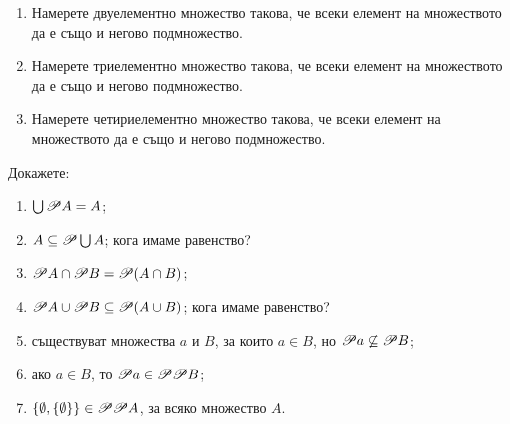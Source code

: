 \begin{problem}
  \begin{enumerate}
  \item
    Намерете двуелементно множество такова, че всеки елемент на множеството да е също и негово подмножество.
  \item
    Намерете триелементно множество такова, че всеки елемент на множеството да е също и негово подмножество.
  \item
    Намерете четириелементно множество такова, че всеки елемент на множеството да е също и негово подмножество.
\end{enumerate}
\end{problem}


\begin{problem}
  Докажете:
  \begin{enumerate}
  \item
    $\bigcup\mathscr{P} A = A$;
  \item
    $A\subseteq\mathscr{P}\bigcup A$; кога имаме равенство?
  \item
    $\mathscr{P} A \cap \mathscr{P} B = \mathscr{P}(A\cap B)$;
  \item
    $\mathscr{P} A \cup \mathscr{P} B \subseteq\mathscr{P}(A\cup B)$; кога имаме равенство?
  \item
    съществуват множества $a$ и $B$, за които $a\in B$, но $\mathscr{P}{a}\not\subseteq\mathscr{P}{B}$;
  \item
    ако $a\in B$, то $\mathscr{P}{a}\in\mathscr{P}\mathscr{P}{B}$;
  \item
    $\{\emptyset,\{\emptyset\}\} \in \mathscr{P}\mathscr{P}{A}$, за всяко множество $A$.
  \end{enumerate}
\end{problem}



